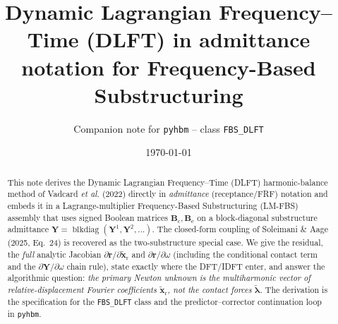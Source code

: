 \documentclass[11pt]{article}
\title{\bf Dynamic Lagrangian Frequency--Time (DLFT) in admittance
notation for Frequency-Based Substructuring}
\author{Companion note for \texttt{pyhbm} -- class \texttt{FBS\_DLFT}}
\date{\today}
\newcommand{\Yb}{\bm{Y}}
\newcommand{\Bb}{\bm{B}}
\newcommand{\blkdiag}{\operatorname{blkdiag}}
\newcommand{\xr}{\tilde{\bm{x}}_{\mathrm r}}      %
\newcommand{\lamt}{\tilde{\bm{\lambda}}}          %
\begin{document}
\maketitle

\begin{abstract}
This note derives the Dynamic Lagrangian Frequency--Time (DLFT)
harmonic-balance method of Vadcard \emph{et al.} (2022) directly in
\emph{admittance} (receptance/FRF) notation and embeds it in a
Lagrange-multiplier Frequency-Based Substructuring (LM-FBS) assembly
that uses signed Boolean matrices $\Bb_{\mathrm c},\Bb_{\mathrm e}$ on a
block-diagonal substructure admittance $\Yb=\blkdiag(\Yb^1,\Yb^2,\dots)$.
The closed-form coupling of Soleimani \& Aage (2025, Eq.~24) is recovered
as the two-substructure special case. We give the residual, the
\emph{full} analytic Jacobian $\partial\bm r/\partial\xr$ and
$\partial\bm r/\partial\omega$ (including the conditional contact term and
the $\partial\Yb/\partial\omega$ chain rule), state exactly where the
DFT/IDFT enter, and answer the algorithmic question: \emph{the primary
Newton unknown is the multiharmonic vector of relative-displacement
Fourier coefficients $\xr$, not the contact forces $\lamt$.} The
derivation is the specification for the \texttt{FBS\_DLFT} class and the
predictor--corrector continuation loop in \texttt{pyhbm}.
\end{abstract}

\tableofcontents

\end{document}

